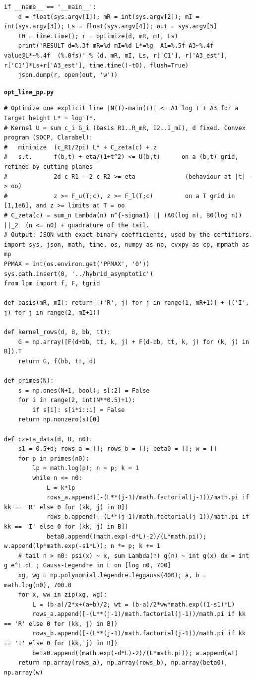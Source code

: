 \documentclass[11pt,reqno]{amsart}
\numberwithin{equation}{section}
\theoremstyle{definition}
\theoremstyle{remark}
\newcommand{\appsub}[1]{\par\medskip\noindent\textbf{#1}\par\nobreak\smallskip}
\begin{document}
\begin{lstlisting}
if __name__ == '__main__':
    d = float(sys.argv[1]); mR = int(sys.argv[2]); mI = int(sys.argv[3]); Ls = float(sys.argv[4]); out = sys.argv[5]
    t0 = time.time(); r = optimize(d, mR, mI, Ls)
    print('RESULT d=%.3f mR=%d mI=%d L*=%g  A1=%.5f A3~%.4f  value@L*~%.4f  (%.0fs)' % (d, mR, mI, Ls, r['C1'], r['A3_est'], r['C1']*Ls+r['A3_est'], time.time()-t0), flush=True)
    json.dump(r, open(out, 'w'))
\end{lstlisting}
\appsub{\texttt{opt\_line\_pp.py}}
\begin{lstlisting}
# Optimize one explicit line |N(T)-main(T)| <= A1 log T + A3 for a target height L* = log T*.
# Kernel U = sum c_i G_i (basis R1..R_mR, I2..I_mI), d fixed. Convex program (SOCP, Clarabel):
#   minimize  (c_R1/2pi) L* + C_zeta(c) + z
#   s.t.      f(b,t) + eta/(1+t^2) <= U(b,t)      on a (b,t) grid, refined by cutting planes
#             2d c_R1 - 2 c_R2 >= eta              (behaviour at |t| -> oo)
#             z >= F_u(T;c), z >= F_l(T;c)         on a T grid in [1,1e6], and z >= limits at T = oo
# C_zeta(c) = sum_n Lambda(n) n^{-sigma1} || (A0(log n), B0(log n)) ||_2  (n <= n0) + quadrature of the tail.
# Output: JSON with exact binary coefficients, used by the certifiers.
import sys, json, math, time, os, numpy as np, cvxpy as cp, mpmath as mp
PPMAX = int(os.environ.get('PPMAX', '0'))
sys.path.insert(0, '../hybrid_asymptotic')
from lpm import f, F, tgrid

def basis(mR, mI): return [('R', j) for j in range(1, mR+1)] + [('I', j) for j in range(2, mI+1)]

def kernel_rows(d, B, bb, tt):
    G = np.array([F(d+bb, tt, k, j) + F(d-bb, tt, k, j) for (k, j) in B]).T
    return G, f(bb, tt, d)

def primes(N):
    s = np.ones(N+1, bool); s[:2] = False
    for i in range(2, int(N**0.5)+1):
        if s[i]: s[i*i::i] = False
    return np.nonzero(s)[0]

def czeta_data(d, B, n0):
    s1 = 0.5+d; rows_a = []; rows_b = []; beta0 = []; w = []
    for p in primes(n0):
        lp = math.log(p); n = p; k = 1
        while n <= n0:
            L = k*lp
            rows_a.append([-(L**(j-1)/math.factorial(j-1))/math.pi if kk == 'R' else 0 for (kk, j) in B])
            rows_b.append([-(L**(j-1)/math.factorial(j-1))/math.pi if kk == 'I' else 0 for (kk, j) in B])
            beta0.append((math.exp(-d*L)-2)/(L*math.pi)); w.append(lp*math.exp(-s1*L)); n *= p; k += 1
    # tail n > n0: psi(x) ~ x, sum Lambda(n) g(n) ~ int g(x) dx = int g e^L dL ; Gauss-Legendre in L on [log n0, 700]
    xg, wg = np.polynomial.legendre.leggauss(400); a, b = math.log(n0), 700.0
    for x, ww in zip(xg, wg):
        L = (b-a)/2*x+(a+b)/2; wt = (b-a)/2*ww*math.exp((1-s1)*L)
        rows_a.append([-(L**(j-1)/math.factorial(j-1))/math.pi if kk == 'R' else 0 for (kk, j) in B])
        rows_b.append([-(L**(j-1)/math.factorial(j-1))/math.pi if kk == 'I' else 0 for (kk, j) in B])
        beta0.append((math.exp(-d*L)-2)/(L*math.pi)); w.append(wt)
    return np.array(rows_a), np.array(rows_b), np.array(beta0), np.array(w)



\end{lstlisting}
\end{document}
